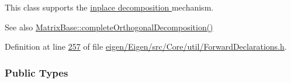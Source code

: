 This class supports the \hyperlink{group___inplace_decomposition}{inplace decomposition } mechanism.

\begin{DoxySeeAlso}{See also}
\hyperlink{group___core___module_ae90b6846f05bd30b8d52b66e427e3e09}{Matrix\+Base\+::complete\+Orthogonal\+Decomposition()} 
\end{DoxySeeAlso}


Definition at line \hyperlink{eigen_2_eigen_2src_2_core_2util_2_forward_declarations_8h_source_l00257}{257} of file \hyperlink{eigen_2_eigen_2src_2_core_2util_2_forward_declarations_8h_source}{eigen/\+Eigen/src/\+Core/util/\+Forward\+Declarations.\+h}.

\subsubsection*{Public Types}

